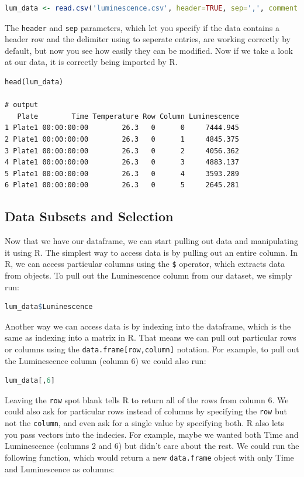 \begin{lstlisting}[language=R]
lum_data <- read.csv('luminescence.csv', header=TRUE, sep=',', comment.char='#')
\end{lstlisting}
The \lstinline!header! and \lstinline!sep! parameters, which let you
specify if the data contains a header row and the delimiter using to
seperate entries, are working correctly by default, but now you see how
easily they can be modified. Now if we take a look at our data, it is
correctly being imported by R.

\begin{lstlisting}
head(lum_data)

# output
   Plate        Time Temperature Row Column Luminescence
1 Plate1 00:00:00:00        26.3   0      0     7444.945
2 Plate1 00:00:00:00        26.3   0      1     4845.375
3 Plate1 00:00:00:00        26.3   0      2     4056.362
4 Plate1 00:00:00:00        26.3   0      3     4883.137
5 Plate1 00:00:00:00        26.3   0      4     3593.289
6 Plate1 00:00:00:00        26.3   0      5     2645.281
\end{lstlisting}
\subsection{Data Subsets and Selection}

Now that we have our dataframe, we can start pulling out data and
manipulating it using R. The simplest way to access data is by pulling
out an entire column. In R, we can access particular columns using the
\lstinline!$! operator, which extracts data from objects. To pull out
the Luminescence column from our dataset, we simply run:

\begin{lstlisting}[language=R]
lum_data$Luminescence
\end{lstlisting}
Another way we can access data is by indexing into the dataframe, which
is the same as indexing into a matrix in R. That means we can pull out
particular rows or columns using the \lstinline!data.frame[row,column]!
notation. For example, to pull out the Luminescence column (column 6) we
could also run:

\begin{lstlisting}[language=R]
lum_data[,6]
\end{lstlisting}
Leaving the \lstinline!row! spot blank tells R to return all of the rows
from column 6. We could also ask for particular rows instead of columns
by specifying the \lstinline!row! but not the \lstinline!column!, and
even ask for a single value by specifying both. R also lets you pass
vectors into the indecies. For example, maybe we wanted both Time and
Luminescence (columns 2 and 6) but didn't care about the rest. We could
run the following function, which would return a new
\lstinline!data.frame! object with only Time and Luminescence as
columns:


